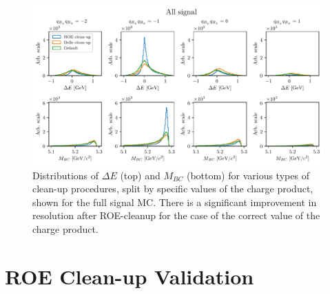\begin{figure}[!htb]
	\centering
	\captionsetup{width=0.8\linewidth}
	\includegraphics[width=\linewidth]{fig/roe_split}
	\caption{Distributions of $\Delta E$ (top) and $M_{BC}$ (bottom) for various types of clean-up procedures, split by specific values of the charge product, shown for the full signal MC. There is a significant improvement in resolution after ROE-cleanup for the case of the correct value of the charge product.}
	\label{fig:roe_split}
\end{figure}

\section{ROE Clean-up Validation}

